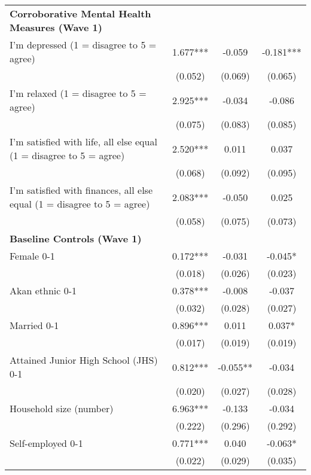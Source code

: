 \begin{ThreePartTable}
\begin{table}[tbp]
\begin{tabular}{lccc}
\textbf{Corroborative Mental Health Measures (Wave 1)} & & & \\ 
 I'm depressed (1 = disagree to 5 = agree) & 1.677*** & -0.059 & -0.181*** \\ [0.1em] 
                   &      (0.052)     &      (0.069)     &      (0.065)     \\ [0.1em] 
 I'm relaxed (1 = disagree to 5 = agree) & 2.925*** & -0.034 & -0.086 \\ [0.1em] 
                   &      (0.075)     &      (0.083)     &      (0.085)     \\ [0.1em] 
 I'm satisfied with life, all else equal (1 = disagree to 5 = agree) & 2.520*** & 0.011 & 0.037 \\ [0.1em] 
                   &      (0.068)     &      (0.092)     &      (0.095)     \\ [0.1em] 
 I'm satisfied with finances, all else equal (1 = disagree to 5 = agree) & 2.083*** & -0.050 & 0.025 \\ [0.1em] 
                   &      (0.058)     &      (0.075)     &      (0.073)     \\ [0.1em] 
\textbf{Baseline Controls (Wave 1)} & & & \\ 
 Female 0-1 & 0.172*** & -0.031 & -0.045* \\ [0.1em] 
                   &      (0.018)     &      (0.026)     &      (0.023)     \\ [0.1em] 
 Akan ethnic 0-1 & 0.378*** & -0.008 & -0.037 \\ [0.1em] 
                   &      (0.032)     &      (0.028)     &      (0.027)     \\ [0.1em] 
 Married 0-1 & 0.896*** & 0.011 & 0.037* \\ [0.1em] 
                   &      (0.017)     &      (0.019)     &      (0.019)     \\ [0.1em] 
 Attained Junior High School (JHS) 0-1 & 0.812*** & -0.055** & -0.034 \\ [0.1em] 
                   &      (0.020)     &      (0.027)     &      (0.028)     \\ [0.1em] 
 Household size (number) & 6.963*** & -0.133 & -0.034 \\ [0.1em] 
                   &      (0.222)     &      (0.296)     &      (0.292)     \\ [0.1em] 
 Self-employed 0-1 & 0.771*** & 0.040 & -0.063* \\ [0.1em] 
                   &      (0.022)     &      (0.029)     &      (0.035)     \\ [0.1em] 

\end{tabular}
\end{table}
\end{ThreePartTable}
